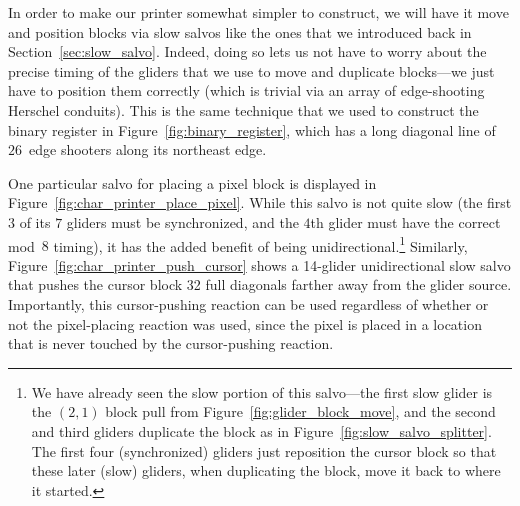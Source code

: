 In order to make our printer somewhat simpler to construct, we will have it move and position blocks via slow salvos like the ones that we introduced back in Section~\ref{sec:slow_salvo}. Indeed, doing so lets us not have to worry about the precise timing of the gliders that we use to move and duplicate blocks---we just have to position them correctly (which is trivial via an array of edge-shooting Herschel conduits). This is the same technique that we used to construct the binary register in Figure~\ref{fig:binary_register}, which has a long diagonal line of $26$~edge shooters along its northeast edge.

One particular salvo for placing a pixel block is displayed in Figure~\ref{fig:char_printer_place_pixel}. While this salvo is not quite slow (the first $3$ of its $7$ gliders must be synchronized, and the $4$th glider must have the correct mod~$8$ timing), it has the added benefit of being unidirectional.\footnote{We have already seen the slow portion of this salvo---the first slow glider is the $(2,1)$ block pull from Figure~\ref{fig:glider_block_move}, and the second and third gliders duplicate the block as in Figure~\ref{fig:slow_salvo_splitter}. The first four (synchronized) gliders just reposition the cursor block so that these later (slow) gliders, when duplicating the block, move it back to where it started.} Similarly, Figure~\ref{fig:char_printer_push_cursor} shows a 14-glider unidirectional slow salvo that pushes the cursor block 32 full diagonals farther away from the glider source. Importantly, this cursor-pushing reaction can be used regardless of whether or not the pixel-placing reaction was used, since the pixel is placed in a location that is never touched by the cursor-pushing reaction.

